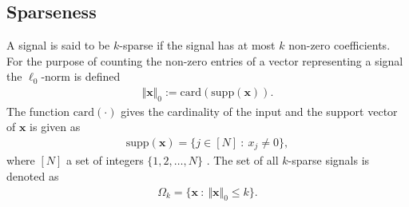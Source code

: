 \subsection{Sparseness} 
A signal is said to be $k$-sparse if the signal has at most $k$ non-zero coefficients. For the purpose of counting the non-zero entries of a vector representing a signal the $\ell_0$-norm is defined
\begin{align*}
\Vert \mathbf{x} \Vert_0 := \text{card}(\text{supp}(\mathbf{x})).
\end{align*}
The function $\text{card}(\cdot)$ gives the cardinality of the input and the support vector of $\mathbf{x}$ is given as
\begin{align*}
\text{supp}(\mathbf{x}) = \{ j \in [N] \ : \ x_j \neq 0 \},
\end{align*} 
where $[N]$ a set of integers $\{1,2,\hdots,N\}$ \cite[p. 41]{FR}. The set of all $k$-sparse signals is denoted as
\begin{align*}
\Omega_k = \{ \mathbf{x} \ : \ \Vert \mathbf{x} \Vert_0 \leq k \}.
\end{align*}


